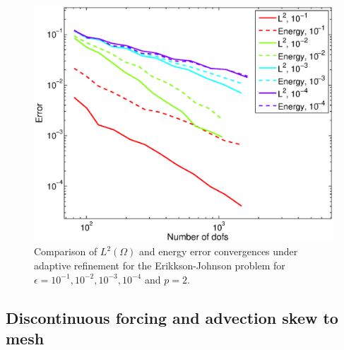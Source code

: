 \documentclass[final,leqno]{siamltex}
\newcommand{\LRp}[1]{\left( #1 \right)}
\renewcommand{\L}{L^2\LRp{\Omega}}
\begin{document}
\begin{figure}[!h]
\centering
\includegraphics[scale=.6]{figs/epsRangeComparison.eps}
\caption{Comparison of $\L$ and energy error convergences under adaptive refinement for the Erikkson-Johnson problem for $\epsilon = 10^{-1}, 10^{-2}, 10^{-3}, 10^{-4}$ and $p=2$.}
\label{fig:erikksonEpsComparison}
\end{figure}

\subsection{Discontinuous forcing and advection skew to mesh}
\end{document}
